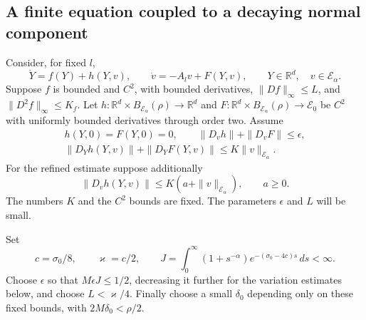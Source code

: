 \documentclass[11pt]{amsart}
\theoremstyle{definition}
\theoremstyle{remark}
\newcommand{\RR}{\mathbb R}
\begin{document}
\subsection{A finite equation coupled to a decaying normal component}
Consider, for fixed $l$,
\begin{equation}\label{eq:abstract-system}
 \dot Y=f(Y)+h(Y,v),\qquad
 \dot v=-A_lv+F(Y,v),\qquad Y\in\RR^d,\quad v\in\mathcal E_\alpha .
\end{equation}
Suppose $f$ is bounded and $C^2$, with bounded derivatives,
$\|Df\|_\infty\le L$, and $\|D^2f\|_\infty\le K_f$.
Let $h:\RR^d\times B_{\mathcal E_\alpha}(\rho)\to\RR^d$
and $F:\RR^d\times B_{\mathcal E_\alpha}(\rho)\to\mathcal E_0$
be $C^2$ with uniformly bounded derivatives through order two.
Assume
\begin{equation}\label{eq:phase-hypotheses}
 \begin{gathered}
 h(Y,0)=F(Y,0)=0,\qquad
 \|D_vh\|+\|D_vF\|\le\epsilon,\\
 \|D_Yh(Y,v)\|+\|D_YF(Y,v)\|\le K\|v\|_{\mathcal E_\alpha}.
 \end{gathered}
\end{equation}
For the refined estimate suppose additionally
\begin{equation}\label{eq:refined-forcing}
 \|D_vh(Y,v)\|\le K(a+\|v\|_{\mathcal E_\alpha}),\qquad a\ge0.
\end{equation}
The numbers $K$ and the $C^2$ bounds are fixed. The parameters
$\epsilon$ and $L$ will be small.

Set
\[
 c=\sigma_0/8,\qquad \varkappa=c/2,\qquad
 J=\int_0^\infty(1+s^{-\alpha})
                         e^{-(\sigma_0-4c)s}\,ds<\infty.
\]
Choose $\epsilon$ so that $M\epsilon J\le1/2$, decreasing it
further for the variation estimates below, and choose $L<\varkappa/4$.
Finally choose a small $\delta_0$ depending only on these fixed
bounds, with $2M\delta_0<\rho/2$.
\end{document}
